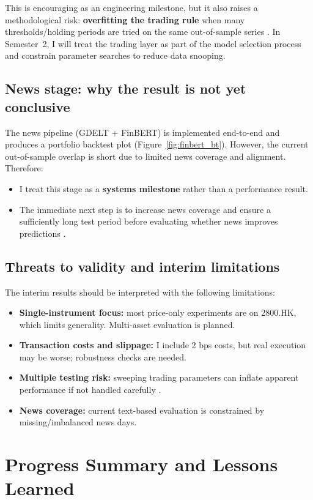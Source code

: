 \documentclass[12pt,a4paper,oneside]{report}
\begin{document}
This is encouraging as an engineering milestone, but it also raises a methodological risk: \textbf{overfitting the trading rule} when many thresholds/holding periods are tried on the same out-of-sample series \citep{white2000,bailey2014}. In Semester~2, I will treat the trading layer as part of the model selection process and constrain parameter searches to reduce data snooping.

\section{News stage: why the result is not yet conclusive}
The news pipeline (GDELT + FinBERT) is implemented end-to-end and produces a portfolio backtest plot (Figure~\ref{fig:finbert_bt}). However, the current out-of-sample overlap is short due to limited news coverage and alignment. Therefore:
\begin{itemize}
  \item I treat this stage as a \textbf{systems milestone} rather than a performance result.
  \item The immediate next step is to increase news coverage and ensure a sufficiently long test period before evaluating whether news improves predictions \citep{leetaru2013gdelt,araci2019finbert,tetlock2007}.
\end{itemize}

\section{Threats to validity and interim limitations}
The interim results should be interpreted with the following limitations:
\begin{itemize}
  \item \textbf{Single-instrument focus:} most price-only experiments are on 2800.HK, which limits generality. Multi-asset evaluation is planned.
  \item \textbf{Transaction costs and slippage:} I include 2 bps costs, but real execution may be worse; robustness checks are needed.
  \item \textbf{Multiple testing risk:} sweeping trading parameters can inflate apparent performance if not handled carefully \citep{white2000,bailey2014}.
  \item \textbf{News coverage:} current text-based evaluation is constrained by missing/imbalanced news days.
\end{itemize}

\chapter{Progress Summary and Lessons Learned}
\end{document}

